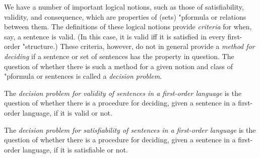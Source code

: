 \documentclass[../../include/open-logic-section]{subfiles}
\begin{document}

\begin{explain}
We have a number of important logical notions, such as those of
satisfiability, validity, and consequence, which are properties of
(sets) "p{formula} or relations between them.  The definitions of these
logical notions provide \emph{criteria} for when, say, a sentence is
valid. (In this case, it is valid iff it is satisfied in every first-order
"{structure}.)  These criteria, however, do not in general provide a
\emph{method for deciding} if a sentence or set of sentences has the
property in question.  The question of whether there is such a method
for a given notion and class of "p{formula} or sentences is called a
\emph{decision problem}.
\end{explain}

\begin{ex}
The \emph{decision problem for validity of sentences in a first-order
  language} is the question of whether there is a procedure for
deciding, given a sentence in a first-order language, if it is valid
or not.
\end{ex}

\begin{ex}
The \emph{decision problem for satisfiability of sentences in a first-order
  language} is the question of whether there is a procedure for
deciding, given a sentence in a first-order language, if it is satisfiable
or not.
\end{ex}
\end{document}

